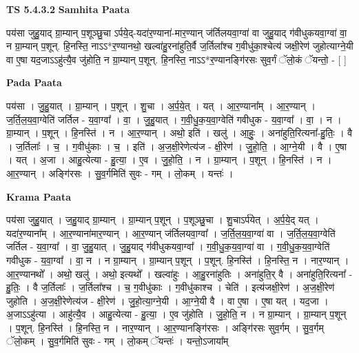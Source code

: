 \documentclass[17pt]{extarticle}
\begin{document}
\textbf{TS 5.4.3.2 } \newline
\textbf{Samhita Paata} \newline

पय॑सा जुहु॒याद् ग्रा॒म्यान् प॒शूञ्छु॒चा ऽर्पये॒द्-यदा॑र॒ण्याना॑-मार॒ण्यान् ज॑र्तिलयवा॒ग्वा॑ वा जुहु॒याद् ग॑वीधुकयवा॒ग्वा॑ वा॒ न ग्रा॒म्यान् प॒शून्. हि॒नस्ति॒ नाऽऽ*र॒ण्यानथो॒ खल्वा॑हु॒रना॑हुति॒र्वै ज॒र्तिला᳚श्च ग॒वीधु॑का॒श्चेत्य॑ जक्षी॒रेण॑ जुहोत्याग्ने॒यी वा ए॒षा यद॒जाऽऽहु॑त्यै॒व जु॑होति॒ न ग्रा॒म्यान् प॒शून्. हि॒नस्ति॒ नाऽऽ*र॒ण्यानङ्गि॑रसः सुव॒र्गं ॅलो॒कं ॅयन्तो॒ - [  ] \newline

\textbf{Pada Paata} \newline

पय॑सा । जु॒हु॒यात् । ग्रा॒म्यान् । प॒शून् । शु॒चा । अ॒र्प॒ये॒त् । यत् । आ॒र॒ण्याना᳚म् । आ॒र॒ण्यान् । ज॒र्ति॒ल॒य॒वा॒ग्वेति॑ जर्तिल - य॒वा॒ग्वा᳚ । वा॒ । जु॒हु॒यात् । ग॒वी॒धु॒क॒य॒वा॒ग्वेति॑ गवीधुक - य॒वा॒ग्वा᳚ । वा॒ । न । ग्रा॒म्यान् । प॒शून् । हि॒नस्ति॑ । न । आ॒र॒ण्यान् । अथो॒ इति॑ । खलु॑ । आ॒हुः॒ । अना॑हुति॒रित्यना᳚-हु॒तिः॒ । वै । ज॒र्तिलाः᳚ । च॒ । ग॒वीधु॑काः । च॒ । इति॑ । अ॒ज॒क्षी॒रेणेत्य॑ज - क्षी॒रेण॑ । जु॒हो॒ति॒ । आ॒ग्ने॒यी । वै । ए॒षा । यत् । अ॒जा । आहु॒त्येत्या - हु॒त्या॒ । ए॒व । जु॒हो॒ति॒ । न । ग्रा॒म्यान् । प॒शून् । हि॒नस्ति॑ । न । आ॒र॒ण्यान् । अङ्गि॑रसः । सु॒व॒र्गमिति॑ सुवः - गम् । लो॒कम् । यन्तः॑ ।  \newline


\textbf{Krama Paata} \newline

पय॑सा जुहु॒यात् । ज॒हु॒याद् ग्रा॒म्यान् । ग्रा॒म्यान् प॒शून् । प॒शूञ्छु॒चा । शु॒चाऽर्प॑येत् । अ॒र्प॒ये॒द् यत् । यदा॑र॒ण्याना᳚म् । आ॒र॒ण्याना॑मार॒ण्यान् । आ॒र॒ण्यान् ज॑र्तिलयवा॒ग्वा᳚ । ज॒र्ति॒ल॒य॒वा॒ग्वा॑ वा । ज॒र्ति॒ल॒य॒वा॒ग्वेति॑ जर्तिल - य॒वा॒ग्वा᳚ । वा॒ जु॒हु॒यात् । जु॒हु॒याद् ग॑वीधुकयवा॒ग्वा᳚ । ग॒वी॒धु॒क॒य॒वा॒ग्वा॑ वा । ग॒वी॒धु॒क॒य॒वा॒ग्वेति॑ गवीधुक - य॒वा॒ग्वा᳚ । वा॒ न । न ग्रा॒म्यान् । ग्रा॒म्यान् प॒शून् । प॒शून्. हि॒नस्ति॑ । हि॒नस्ति॒ न । नार॒ण्यान् । आ॒र॒ण्यानथो᳚ । अथो॒ खलु॑ । अथो॒ इत्यथो᳚ । खल्वा॑हुः । आ॒हु॒रना॑हुतिः । अना॑हुति॒र् वै । अना॑हुति॒रित्यना᳚ - हु॒तिः॒ । वै ज॒र्तिलाः᳚ । ज॒र्तिला᳚श्च । च॒ ग॒वीधु॑काः । ग॒वीधु॑काश्च । चेति॑ । इत्य॑जक्षी॒रेण॑ । अ॒ज॒क्षी॒रेण॑ जुहोति । अ॒ज॒क्षी॒रेणेत्य॑ज - क्षी॒रेण॑ । जु॒हो॒त्या॒ग्ने॒यी । आ॒ग्ने॒यी वै । वा ए॒षा । ए॒षा यत् । यद॒जा । अ॒जाऽऽहु॑त्या । आहु॑त्यै॒व । आहु॒त्येत्या - हु॒त्या॒ । ए॒व जु॑होति । जु॒हो॒ति॒ न । न ग्रा॒म्यान् । ग्रा॒म्यान् प॒शून् । प॒शून्. हि॒नस्ति॑ । हि॒नस्ति॒ न । नार॒ण्यान् । आ॒र॒ण्यानङ्गि॑रसः । अङ्गि॑रसः सुव॒र्गम् । सु॒व॒र्गम् ॅलो॒कम् । सु॒व॒र्गमिति॑ सुवः - गम् । लो॒कम् ॅयन्तः॑ । यन्तो॒ऽजाया᳚म् \newline
\end{document}
